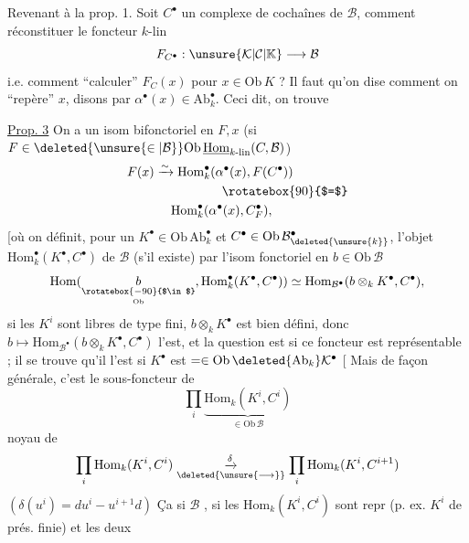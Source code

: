 Revenant à la prop. 1. Soit $C^\bullet$ 
un complexe de cochaînes de $\mathcal B$, comment réconstituer le foncteur $k$-lin
\[
 F_{C^\bullet}: \unsure{\mathcal K|\mathcal C|\mathbb K}\longrightarrow\mathcal B
\]
i.e. comment ``calculer'' $F_C(x)$ pour $x\in\mathrm{Ob}\,K$ ?
Il faut qu'on dise comment on ``repère'' $x$,
disons par $\alpha^\bullet(x)\in\mathrm{Ab}_k^\bullet$. Ceci dit, on trouve

\uline{Prop. 3} On a un isom bifonctoriel en $F,x$
(si $F\in\deleted{\unsure{\in|\mathcal B}}\mathrm{Ob}\,\underline{\mathrm{Hom}}_{k\text{-}\mathrm{lin}}(C,\mathcal B)$)
\[
\begin{aligned}
 F(x)&\xrightarrow{\sim}\mathrm{Hom}_k^\bullet(\alpha^\bullet(x),F(C^\bullet))\\
 &\hspace{5.3em}\rotatebox{90}{$=$}\\
 &\hspace{1.3em}\mathrm{Hom}_k^\bullet(\alpha^\bullet(x),C_F^\bullet),
\end{aligned}
\]
[où on définit, pour un $K^\bullet\in\mathrm{Ob}\,\mathrm{Ab}_k^\bullet$
et $C^\bullet\in\mathrm{Ob}\,\mathcal B^\bullet_{\deleted{\unsure{k}}}$,
l'objet $\mathrm{Hom}_k^\bullet(K^\bullet,C^\bullet)$ de $\mathcal B$
(s'il existe) par l'isom fonctoriel en $b\in\mathrm{Ob}\,\mathcal B$
\[
 \mathrm{Hom}(\underset{\underset{\mathrm{Ob}}{\rotatebox{-90}{$\in$}}}{b},
 \mathrm{Hom}_k^\bullet(K^\bullet,C^\bullet))
 \simeq\mathrm{Hom}_{\mathcal B^\bullet}(b\otimes_k K^\bullet,C^\bullet),
\]
si les $K^i$ sont libres de type fini, $b\otimes_k K^\bullet$
est bien défini, donc $b\longmapsto\mathrm{Hom}_{\mathcal B^\bullet}(b\otimes_k K^\bullet,C^\bullet)$
l'est, et la question est si ce foncteur est représentable ; il se trouve qu'il l'est si
$K^\bullet$ est  $=\in\mathrm{Ob}\,\deleted{\mathrm{Ab}_k}\mathcal K^\bullet$
[ Mais de façon générale, c'est le sous-foncteur de
\[
 \prod_i\underbrace{\mathrm{Hom}_k(K^i,C^i)}_{\in\mathrm{Ob}\,\mathcal B}
\]
noyau de
\[
 \prod_i\mathrm{Hom}_k(K^i,C^i)\mathrel{\underset{\deleted{\unsure{\longrightarrow}}}{\xrightarrow{\delta}}}\prod_i\mathrm{Hom}_k(K^i,C^{i+1})
\]
$(\delta(u^i)=du^i-u^{i+1}d)$  Ça  si
$\mathcal B$  ,
si les $\mathrm{Hom}_k(K^i,C^i)$ sont repr (p. ex.  $K^i$ de prés. finie) et les deux
